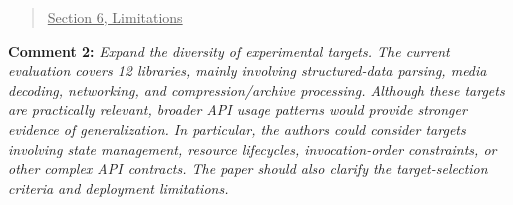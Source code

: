\documentclass[onecolumn,11pt]{article}
\newcommand{\secc}[2]{\par\mySep \noindent \textsf{\textbf{#1 }}\textit{#2}\par}
\newcommand{\nc}[2]{\needspace{5\baselineskip}\begin{quote}\underline{#1}\\ \nopagebreak[4]{\leavevmode\color{blue}{``#2"}}\end{quote}}
\newcommand{\mySep}{\vspace{8pt}}
\begin{document}
\nc{Section 6, Limitations}{The evaluation covers third-party-library components of connected-vehicle software. Full vehicle stacks, ECU integration, and on-vehicle deployment are not exercised, so the results describe component-level crash adjudication rather than vehicle-level behavior. The method uses sanitizer evidence, stack-frame roles, representative matching, and reconstructed execution context; these designs address driver/component attribution and do not depend on a vehicle-specific protocol or an on-vehicle execution environment.}

\secc{Comment 2:}{Expand the diversity of experimental targets. The current evaluation covers 12 libraries, mainly involving structured-data parsing, media decoding, networking, and compression/archive processing. Although these targets are practically relevant, broader API usage patterns would provide stronger evidence of generalization. In particular, the authors could consider targets involving state management, resource lifecycles, invocation-order constraints, or other complex API contracts. The paper should also clarify the target-selection criteria and deployment limitations.}
\end{document}
